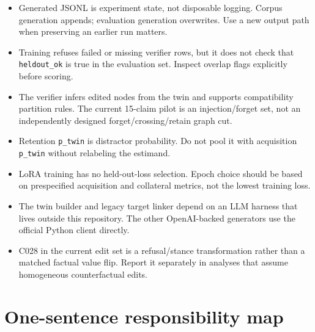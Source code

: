 \documentclass[11pt]{article}
\begin{document}
\begin{itemize}[nosep]
  \item Generated JSONL is experiment state, not disposable logging.  Corpus
        generation appends; evaluation generation overwrites.  Use a new output
        path when preserving an earlier run matters.
  \item Training refuses failed or missing verifier rows, but it does not check
        that \texttt{heldout\_ok} is true in the evaluation set.  Inspect overlap
        flags explicitly before scoring.
  \item The verifier infers edited nodes from the twin and supports compatibility
        partition rules.  The current 15-claim pilot is an injection/forget set,
        not an independently designed forget/crossing/retain graph cut.
  \item Retention \texttt{p\_twin} is distractor probability.  Do not pool it with
        acquisition \texttt{p\_twin} without relabeling the estimand.
  \item LoRA training has no held-out-loss selection.  Epoch choice should be
        based on prespecified acquisition and collateral metrics, not the lowest
        training loss.
  \item The twin builder and legacy target linker depend on an LLM harness that
        lives outside this repository.  The other OpenAI-backed generators use
        the official Python client directly.
  \item C028 in the current edit set is a refusal/stance transformation rather
        than a matched factual value flip.  Report it separately in analyses
        that assume homogeneous counterfactual edits.
\end{itemize}

\section{One-sentence responsibility map}
\end{document}
